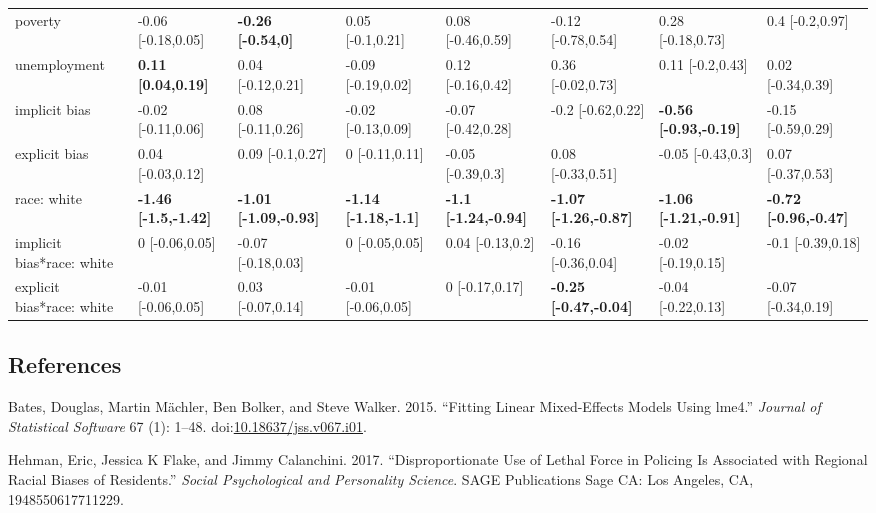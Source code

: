 \documentclass[]{article}
\theoremstyle{definition}
\theoremstyle{definition}
\theoremstyle{remark}
\begin{document}
\begin{landscape}
\begin{table}
{\begin{tabular}[t]{llllllll}
poverty & -0.06 [-0.18,0.05] & \textbf{-0.26 [-0.54,0]} & 0.05 [-0.1,0.21] & 0.08 [-0.46,0.59] & -0.12 [-0.78,0.54] & 0.28 [-0.18,0.73] & 0.4 [-0.2,0.97]\\
unemployment & \textbf{0.11 [0.04,0.19]} & 0.04 [-0.12,0.21] & -0.09 [-0.19,0.02] & 0.12 [-0.16,0.42] & 0.36 [-0.02,0.73] & 0.11 [-0.2,0.43] & 0.02 [-0.34,0.39]\\
implicit bias & -0.02 [-0.11,0.06] & 0.08 [-0.11,0.26] & -0.02 [-0.13,0.09] & -0.07 [-0.42,0.28] & -0.2 [-0.62,0.22] & \textbf{-0.56 [-0.93,-0.19]} & -0.15 [-0.59,0.29]\\
\addlinespace
explicit bias & 0.04 [-0.03,0.12] & 0.09 [-0.1,0.27] & 0 [-0.11,0.11] & -0.05 [-0.39,0.3] & 0.08 [-0.33,0.51] & -0.05 [-0.43,0.3] & 0.07 [-0.37,0.53]\\
race: white & \textbf{-1.46 [-1.5,-1.42]} & \textbf{-1.01 [-1.09,-0.93]} & \textbf{-1.14 [-1.18,-1.1]} & \textbf{-1.1 [-1.24,-0.94]} & \textbf{-1.07 [-1.26,-0.87]} & \textbf{-1.06 [-1.21,-0.91]} & \textbf{-0.72 [-0.96,-0.47]}\\
implicit bias*race: white & 0 [-0.06,0.05] & -0.07 [-0.18,0.03] & 0 [-0.05,0.05] & 0.04 [-0.13,0.2] & -0.16 [-0.36,0.04] & -0.02 [-0.19,0.15] & -0.1 [-0.39,0.18]\\
explicit bias*race: white & -0.01 [-0.06,0.05] & 0.03 [-0.07,0.14] & -0.01 [-0.06,0.05] & 0 [-0.17,0.17] & \textbf{-0.25 [-0.47,-0.04]} & -0.04 [-0.22,0.13] & -0.07 [-0.34,0.19]\\
\bottomrule
\end{tabular}}
\end{table}
\end{landscape}

\subsection*{References}\label{references}

\hypertarget{refs}{}
\hypertarget{ref-bates2015fitting}{}
Bates, Douglas, Martin Mächler, Ben Bolker, and Steve Walker. 2015.
``Fitting Linear Mixed-Effects Models Using lme4.'' \emph{Journal of
Statistical Software} 67 (1): 1--48.
doi:\href{https://doi.org/10.18637/jss.v067.i01}{10.18637/jss.v067.i01}.

\hypertarget{ref-hehman2017disproportionate}{}
Hehman, Eric, Jessica K Flake, and Jimmy Calanchini. 2017.
``Disproportionate Use of Lethal Force in Policing Is Associated with
Regional Racial Biases of Residents.'' \emph{Social Psychological and
Personality Science}. SAGE Publications Sage CA: Los Angeles, CA,
1948550617711229.
\end{document}
